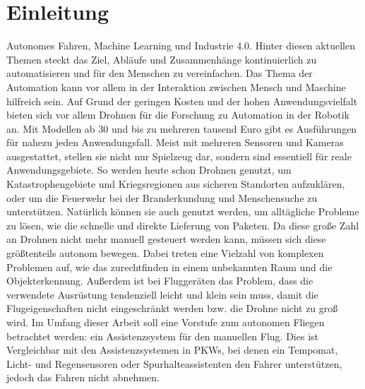 

\pagestyle{plain}
\chapter{Einleitung}
\label{cha:Introduction}

Autonomes Fahren, Machine Learning und Industrie 4.0. Hinter diesen aktuellen Themen steckt das Ziel, Abläufe und Zusammenhänge kontinuierlich zu automatisieren und für den Menschen zu vereinfachen. Das Thema der Automation kann vor allem in der Interaktion zwischen Mensch und Maschine hilfreich sein. Auf Grund der geringen Kosten und der hohen Anwendungsvielfalt bieten sich vor allem Drohnen für die Forschung zu Automation in der Robotik an. \newline
Mit Modellen ab 30 und bis zu mehreren tausend Euro gibt es Ausführungen für nahezu jeden Anwendungsfall. Meist mit mehreren Sensoren und Kameras ausgestattet, stellen sie nicht nur Spielzeug dar, sondern sind essentiell für reale Anwendungsgebiete. \newline
So werden heute schon Drohnen genutzt, um Katastrophengebiete und Kriegsregionen aus sicheren Standorten aufzuklären, oder um die Feuerwehr bei der Branderkundung und Menschensuche zu unterstützen. \newline
Natürlich können sie auch genutzt werden, um alltägliche Probleme zu lösen, wie die schnelle und direkte Lieferung von Paketen. \newline
Da diese große Zahl an Drohnen nicht mehr manuell gesteuert werden kann, müssen sich diese größtenteils autonom bewegen. Dabei treten eine Vielzahl von komplexen Problemen auf, wie das zurechtfinden in einem unbekannten Raum und die Objekterkennung. \newline
Außerdem ist bei Fluggeräten das Problem, dass die verwendete Ausrüstung tendenziell leicht und klein sein muss, damit die Flugeigenschaften nicht eingeschränkt werden bzw. die Drohne nicht zu groß wird. \newline
Im Umfang dieser Arbeit soll eine Vorstufe zum autonomen Fliegen betrachtet werden: ein Assistenzsystem für den manuellen Flug. Dies ist Vergleichbar mit den Assistenzsystemen in PKWs, bei denen ein Tempomat, Licht- und Regensensoren oder Spurhalteassistenten den Fahrer unterstützen, jedoch das Fahren nicht abnehmen. \newline
